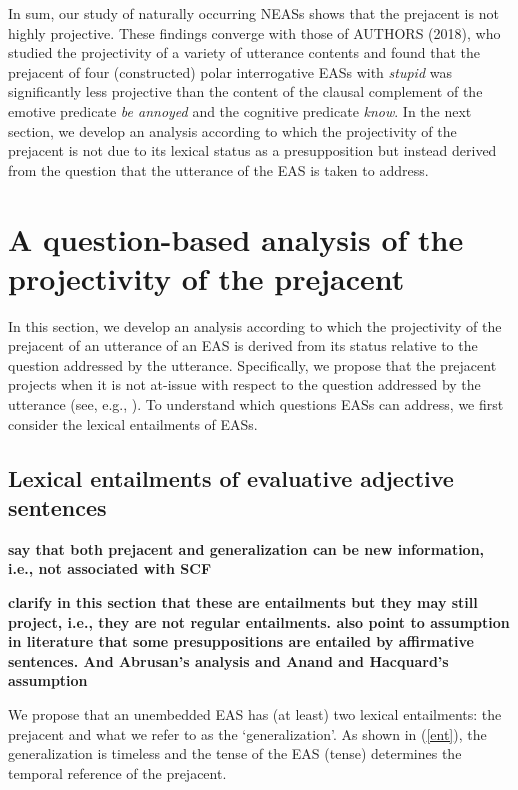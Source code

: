 \documentclass[11pt,fleqn]{article}
\newcommand{\6}{\mbox{$[\hspace*{-.6mm}[$}}
\newcommand{\9}{\mbox{$]\hspace*{-.6mm}]$}}
\begin{document}
In sum, our study of naturally occurring NEASs shows that the prejacent is not highly projective. These findings converge with those of AUTHORS (2018), who studied the projectivity of a variety of utterance contents and found that the prejacent of four (constructed) polar interrogative EASs with {\em stupid} was significantly less projective than the content of the clausal complement of the emotive predicate {\em be annoyed} and the cognitive predicate {\em know}. In the next section, we develop an analysis according to which the projectivity of the prejacent is not due to its lexical status as a presupposition but instead derived from the question that the utterance of the EAS is taken to address. 
 

\section{A question-based analysis of the projectivity of the prejacent}\label{s3}

In this section, we develop an analysis according to which the projectivity of the prejacent of an utterance of an EAS is derived from its status relative to the question addressed by the utterance. Specifically, we propose that the prejacent projects when it is not at-issue with respect to the question addressed by the utterance (see, e.g., \citealt{brst-salt10,brst-ar,best-question}). To understand which questions EASs can address, we first consider the lexical entailments of EASs.

\subsection{Lexical entailments of evaluative adjective sentences}\label{s31}

{\bf say that both prejacent and generalization can be new information, i.e., not associated with SCF}

{\bf clarify in this section that these are entailments but they may still project, i.e., they are not regular entailments. also point to assumption in literature that some presuppositions are entailed by affirmative sentences. And Abrusan's analysis and Anand and Hacquard's assumption}

We propose that an unembedded EAS has (at least) two lexical entailments: the prejacent and what we refer to as the `generalization'. As shown in (\ref{ent}), the generalization is timeless and the tense of the EAS ({\sc tense}) determines the temporal reference of the prejacent.
\end{document}
